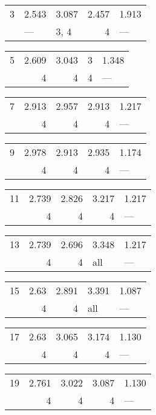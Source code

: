 \begin{tabular}{lllrl}
\toprule
 3 & 2.543 & 3.087 & 2.457 & 1.913 \\
   & ---   & 3, 4  & 4     & ---   \\
\bottomrule
\end{tabular}
\begin{tabular}{lrrrl}
\toprule
 5 & 2.609 & 3.043 & 3 & 1.348 \\
   & 4     & 4     & 4 & ---   \\
\bottomrule
\end{tabular}
\begin{tabular}{lrrrl}
\toprule
 7 & 2.913 & 2.957 & 2.913 & 1.217 \\
   & 4     & 4     & 4     & ---   \\
\bottomrule
\end{tabular}
\begin{tabular}{lrrrl}
\toprule
 9 & 2.978 & 2.913 & 2.935 & 1.174 \\
   & 4     & 4     & 4     & ---   \\
\bottomrule
\end{tabular}
\begin{tabular}{lrrrl}
\toprule
 11 & 2.739 & 2.826 & 3.217 & 1.217 \\
    & 4     & 4     & 4     & ---   \\
\bottomrule
\end{tabular}
\begin{tabular}{lrrll}
\toprule
 13 & 2.739 & 2.696 & 3.348 & 1.217 \\
    & 4     & 4     & all   & ---   \\
\bottomrule
\end{tabular}
\begin{tabular}{lrrll}
\toprule
 15 & 2.63 & 2.891 & 3.391 & 1.087 \\
    & 4    & 4     & all   & ---   \\
\bottomrule
\end{tabular}
\begin{tabular}{lrrrl}
\toprule
 17 & 2.63 & 3.065 & 3.174 & 1.130 \\
    & 4    & 4     & 4     & ---   \\
\bottomrule
\end{tabular}
\begin{tabular}{lrrrl}
\toprule
 19 & 2.761 & 3.022 & 3.087 & 1.130 \\
    & 4     & 4     & 4     & ---   \\
\bottomrule
\end{tabular}
